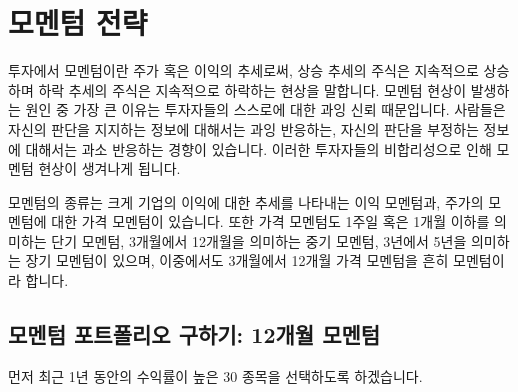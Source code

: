 \documentclass[12pt,]{book}
\begin{document}
\hypertarget{section-52}{%
\section{모멘텀 전략}\label{section-52}}

투자에서 모멘텀이란 주가 혹은 이익의 추세로써, 상승 추세의 주식은 지속적으로 상승하며 하락 추세의 주식은 지속적으로 하락하는 현상을 말합니다. 모멘텀 현상이 발생하는 원인 중 가장 큰 이유는 투자자들의 스스로에 대한 과잉 신뢰 때문입니다. 사람들은 자신의 판단을 지지하는 정보에 대해서는 과잉 반응하는, 자신의 판단을 부정하는 정보에 대해서는 과소 반응하는 경향이 있습니다. 이러한 투자자들의 비합리성으로 인해 모멘텀 현상이 생겨나게 됩니다.

모멘텀의 종류는 크게 기업의 이익에 대한 추세를 나타내는 이익 모멘텀과, 주가의 모멘텀에 대한 가격 모멘텀이 있습니다. 또한 가격 모멘텀도 1주일 혹은 1개월 이하를 의미하는 단기 모멘텀, 3개월에서 12개월을 의미하는 중기 모멘텀, 3년에서 5년을 의미하는 장기 모멘텀이 있으며, 이중에서도 3개월에서 12개월 가격 모멘텀을 흔히 모멘텀이라 합니다.

\hypertarget{section-53}{%
\subsection{모멘텀 포트폴리오 구하기: 12개월 모멘텀}\label{section-53}}

먼저 최근 1년 동안의 수익률이 높은 30 종목을 선택하도록 하겠습니다.
\end{document}
